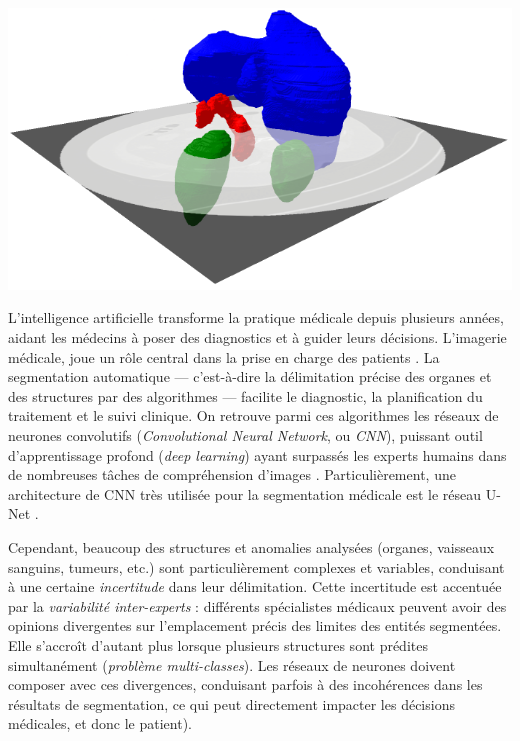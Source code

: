 \documentclass[a4paper,french,bookmarks,12pt]{article}
\begin{document}
    \begin{widetext}
        \begin{minipage}{0.4\linewidth}
            \includegraphics[width=1\textwidth]{figure_UKCHLL001_3D.png}
            \label{figure:3d}
        \end{minipage}
        \hfill
        \begin{minipage}{0.57\linewidth}
            \hspace{32pt} L'intelligence artificielle transforme la pratique médicale depuis plusieurs années, aidant les médecins à poser des diagnostics et à guider leurs décisions. L'imagerie médicale, joue un rôle central dans la prise en charge des patients \parencite{medicalimage}. La segmentation automatique --- c'est-à-dire la délimitation précise des organes et des structures par des algorithmes --- facilite le diagnostic, la planification du traitement et le suivi clinique. On retrouve parmi ces algorithmes les  réseaux de neurones convolutifs (\emph{Convolutional Neural Network}, ou \emph{CNN}), puissant outil d’apprentissage profond (\emph{deep learning}) ayant surpassés les experts humains dans de nombreuses tâches de compréhension d'images \parencite{Sarvamangala2022}. Particulièrement, une architecture de CNN très utilisée pour la segmentation médicale est le réseau U-Net \parencite{unet}.
        \end{minipage}
    \end{widetext}

    Cependant, beaucoup des structures et anomalies analysées (organes, vaisseaux sanguins, tumeurs, etc.) sont particulièrement complexes et variables, conduisant à une certaine \emph{incertitude} dans leur délimitation. Cette incertitude est accentuée par la \emph{variabilité inter-experts} : différents spécialistes médicaux peuvent avoir des opinions divergentes sur l'emplacement précis des limites des entités segmentées. Elle s'accroît d'autant plus lorsque plusieurs structures sont prédites simultanément (\emph{problème multi-classes}). Les réseaux de neurones doivent composer avec ces divergences, conduisant parfois à des incohérences dans les résultats de segmentation, ce qui peut directement impacter les décisions médicales, et donc le patient). 
    
\end{document}
